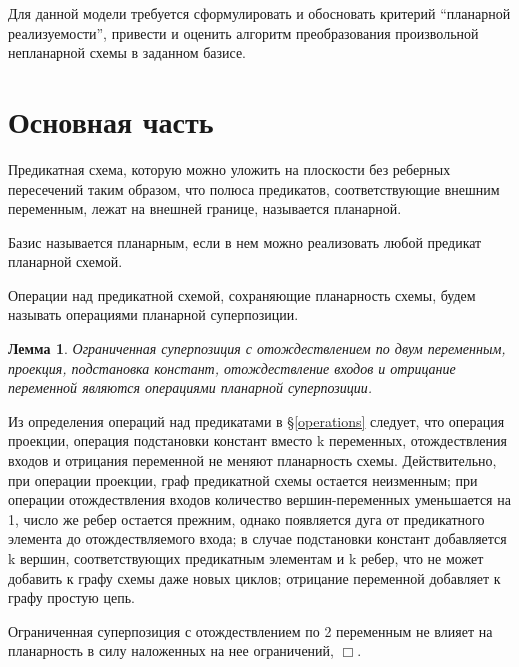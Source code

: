 \documentclass[12pt]{article}
\newtheorem{lemma}[theorem]{Лемма}
\newenvironment{proof}[1][Доказательство]{\begin{trivlist}
\item[\hskip \labelsep {\bfseries #1}]}{\end{trivlist}}
\newenvironment{definition}[1][Определение]{\begin{trivlist}
\item[\hskip \labelsep {\bfseries #1}]}{\end{trivlist}}
\begin{document}
Для данной модели требуется сформулировать и обосновать критерий ``планарной реализуемости'', привести и оценить алгоритм
преобразования произвольной непланарной схемы в заданном базисе.
\clearpage

\section{Основная часть}

\begin{definition}
Предикатная схема, которую можно уложить на плоскости без реберных пересечений таким образом, что полюса предикатов, 
соответствующие внешним переменным, лежат на внешней границе, называется планарной. 
\end{definition}

\begin{definition}
Базис называется планарным, если в нем можно реализовать любой предикат планарной схемой.
\end{definition}

\begin{definition}
Операции над предикатной схемой, сохраняющие планарность схемы, будем называть операциями планарной суперпозиции.
\end{definition}

\begin{lemma}
\label{lemma_planar_ops}
Ограниченная суперпозиция с отождествлением по двум переменным, проекция,
подстановка констант, отождествление входов и отрицание переменной являются операциями планарной суперпозиции.
\end{lemma}
\begin{proof}
Из определения операций над предикатами в \S \ref{operations} следует, что операция проекции, операция подстановки
констант вместо k переменных, отождествления входов и отрицания переменной не меняют планарность схемы. 
Действительно, при операции проекции, граф предикатной схемы остается неизменным; 
при операции отождествления входов количество вершин-переменных уменьшается на 1, число же ребер остается прежним, 
однако появляется дуга от предикатного элемента до отождествляемого входа;
в случае подстановки констант добавляется k вершин, соответствующих предикатным элементам
и k ребер, что не может добавить к графу схемы даже новых циклов;
отрицание переменной добавляет к графу простую цепь. 

Ограниченная суперпозиция с отождествлением по 2 переменным не влияет на планарность в силу наложенных на
нее ограничений, 
$\Box$.
\end{proof}
\end{document}
